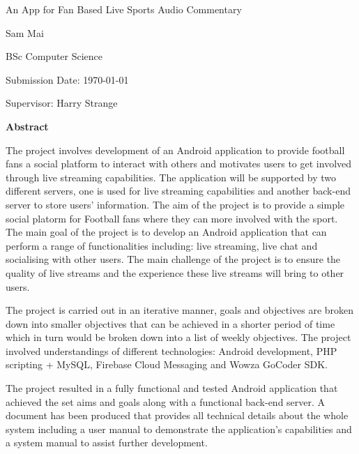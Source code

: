 \documentclass{article}
\begin{document}
\begin{center}
{\Huge An App for Fan Based Live Sports Audio Commentary\\[5cm]}

{\Large Sam Mai

BSc Computer Science

Submission Date: \today

Supervisor: Harry Strange}
\end{center}
\newpage
\begin{center}
{\Large \textbf{Abstract}}
\end{center}
The project involves development of an Android application to provide football fans a social platform to interact with others and motivates users to get involved through live streaming capabilities. The application will be supported by two different servers, one is used for live streaming capabilities and another back-end server to store users' information. The aim of the project is to provide a simple social platorm for Football fans where they can more involved with the sport. The main goal of the project is to develop an Android application that can perform a range of functionalities including: live streaming, live chat and socialising with other users. The main challenge of the project is to ensure the quality of live streams and the experience these live streams will bring to other users.\par
\noindent The project is carried out in an iterative manner, goals and objectives are broken down into smaller objectives that can be achieved in a shorter period of time which in turn would be broken down into a list of weekly objectives. The project involved understandings of different technologies: Android development, PHP scripting + MySQL, Firebase Cloud Messaging and Wowza GoCoder SDK.\par
\noindent The project resulted in a fully functional and tested Android application that achieved the set aims and goals along with a functional back-end server. A document has been produced that provides all technical details about the whole system including a user manual to demonstrate the application's capabilities and a system manual to assist further development.\\
\end{document}
